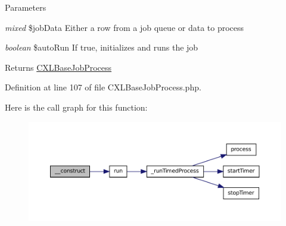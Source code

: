 \begin{DoxyParams}{Parameters}
\item[{\em mixed}]\$jobData Either a row from a job queue or data to process \item[{\em boolean}]\$autoRun If true, initializes and runs the job \end{DoxyParams}
\begin{DoxyReturn}{Returns}
\hyperlink{classCXLBaseJobProcess}{CXLBaseJobProcess} 
\end{DoxyReturn}


Definition at line 107 of file CXLBaseJobProcess.php.








Here is the call graph for this function:\nopagebreak
\begin{figure}[H]
\begin{center}
\leavevmode
\includegraphics[width=400pt]{classCXLBaseJobProcess_ac958924ca9aaf706efd2e636b829237d_cgraph}
\end{center}
\end{figure}




